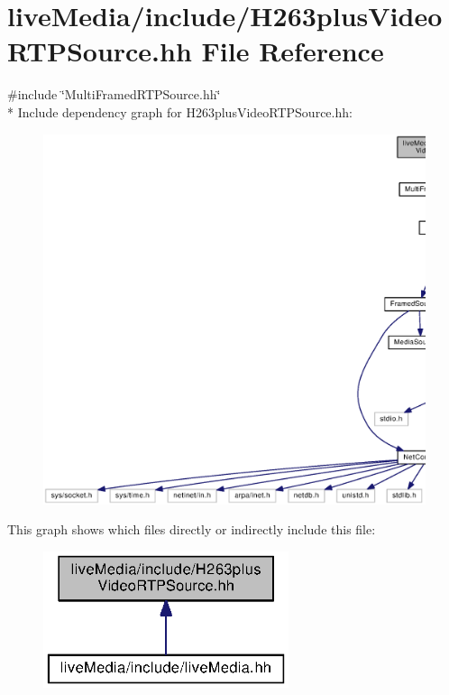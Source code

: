 \section{live\+Media/include/\+H263plus\+Video\+R\+T\+P\+Source.hh File Reference}
\label{H263plusVideoRTPSource_8hh}
{\ttfamily \#include \char`\"{}Multi\+Framed\+R\+T\+P\+Source.\+hh\char`\"{}}\\*
Include dependency graph for H263plus\+Video\+R\+T\+P\+Source.\+hh\+:
\nopagebreak
\begin{figure}[H]
\begin{center}
\leavevmode
\includegraphics[width=350pt]{H263plusVideoRTPSource_8hh__incl}
\end{center}
\end{figure}
This graph shows which files directly or indirectly include this file\+:
\nopagebreak
\begin{figure}[H]
\begin{center}
\leavevmode
\includegraphics[width=204pt]{H263plusVideoRTPSource_8hh__dep__incl}
\end{center}
\end{figure}
